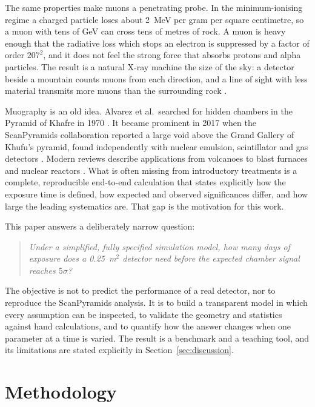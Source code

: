 \documentclass{article}
\begin{document}
The same properties make muons a penetrating probe. In the minimum-ionising
regime a charged particle loses about 2~MeV per gram per square centimetre, so
a muon with tens of GeV can cross tens of metres of rock. A muon is heavy
enough that the radiative loss which stops an electron is suppressed by a
factor of order $207^2$, and it does not feel the strong force that absorbs
protons and alpha particles. The result is a natural X-ray machine the size of
the sky: a detector beside a mountain counts muons from each direction, and a
line of sight with less material transmits more muons than the surrounding
rock \cite{bonomi2020,pdg2024}.

Muography is an old idea. Alvarez et al.\ searched for hidden chambers in the
Pyramid of Khafre in 1970 \cite{alvarez1970}. It became prominent in 2017 when
the ScanPyramids collaboration reported a large void above the Grand Gallery of
Khufu's pyramid, found independently with nuclear emulsion, scintillator and
gas detectors \cite{morishima2017}. Modern reviews describe applications from
volcanoes to blast furnaces and nuclear reactors \cite{bonomi2020}. What is
often missing from introductory treatments is a complete, reproducible
end-to-end calculation that states explicitly how the exposure time is defined,
how expected and observed significances differ, and how large the leading
systematics are. That gap is the motivation for this work.

This paper answers a deliberately narrow question:

\begin{quote}
\emph{Under a simplified, fully specified simulation model, how many days of
exposure does a 0.25~m$^2$ detector need before the expected chamber signal
reaches $5\sigma$?}
\end{quote}

The objective is not to predict the performance of a real detector, nor to
reproduce the ScanPyramids analysis. It is to build a transparent model in
which every assumption can be inspected, to validate the geometry and
statistics against hand calculations, and to quantify how the answer changes
when one parameter at a time is varied. The result is a benchmark and a
teaching tool, and its limitations are stated explicitly in
Section~\ref{sec:discussion}.


\section{Methodology}
\label{sec:method}
\end{document}
